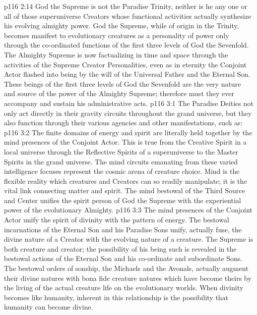 \vs p116 2:14 God the Supreme is not the Paradise Trinity, neither is he any one or all of those superuniverse Creators whose functional activities actually synthesize his evolving almighty power. God the Supreme, while of origin in the Trinity, becomes manifest to evolutionary creatures as a personality of power only through the co\hyp{}ordinated functions of the first three levels of God the Sevenfold. The Almighty Supreme is now factualizing in time and space through the activities of the Supreme Creator Personalities, even as in eternity the Conjoint Actor flashed into being by the will of the Universal Father and the Eternal Son. These beings of the first three levels of God the Sevenfold are the very nature and source of the power of the Almighty Supreme; therefore must they ever accompany and sustain his administrative acts.
\vs p116 3:1 The Paradise Deities not only act directly in their gravity circuits throughout the grand universe, but they also function through their various agencies and other manifestations, such as:
\vs p116 3:2 \bibnobreakspace {} The finite domains of energy and spirit are literally held together by the mind presences of the Conjoint Actor. This is true from the Creative Spirit in a local universe through the Reflective Spirits of a superuniverse to the Master Spirits in the grand universe. The mind circuits emanating from these varied intelligence focuses represent the cosmic arena of creature choice. Mind is the flexible reality which creatures and Creators can so readily manipulate; it is the vital link connecting matter and spirit. The mind bestowal of the Third Source and Center unifies the spirit person of God the Supreme with the experiential power of the evolutionary Almighty.
\vs p116 3:3 \pc {}\bibnobreakspace {} The mind presences of the Conjoint Actor unify the spirit of divinity with the pattern of energy. The bestowal incarnations of the Eternal Son and his Paradise Sons unify, actually fuse, the divine nature of a Creator with the evolving nature of a creature. The Supreme is both creature and creator; the possibility of his being such is revealed in the bestowal actions of the Eternal Son and his co\hyp{}ordinate and subordinate Sons. The bestowal orders of sonship, the Michaels and the Avonals, actually augment their divine natures with bona fide creature natures which have become theirs by the living of the actual creature life on the evolutionary worlds. When divinity becomes like humanity, inherent in this relationship is the possibility that humanity can become divine.
